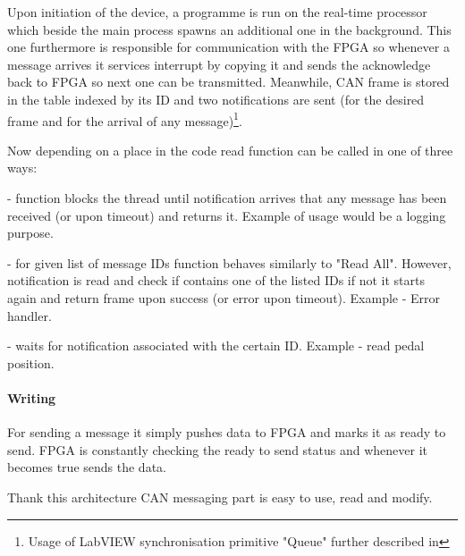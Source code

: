 Upon initiation of the device, a programme is run on the real-time processor which beside the main process spawns an additional one in the background. This one furthermore is responsible for communication with the FPGA so whenever a message arrives it services interrupt by copying it and sends the acknowledge back to FPGA so next one can be transmitted. Meanwhile, CAN frame is stored in the table indexed by its ID and two notifications are sent (for the desired frame and for the arrival of any message)\footnote{Usage of LabVIEW synchronisation primitive "Queue" further described in }.

Now depending on a place in the code read function can be called in one of three ways:
\begin{description}[labelindent=1cm]
    \item[Read All] - function blocks the thread until notification arrives that any message has been received (or upon timeout) and returns it. Example of usage would be a logging purpose.
    \item[Read Some] - for given list of message IDs function behaves similarly to "Read All". However, notification is read and check if contains one of the listed IDs if not it starts again and return frame upon success (or error upon timeout). Example - Error handler.
    \item[Read ID] - waits for notification associated with the certain ID. Example - read pedal position.
    


\end{description}

\paragraph{Writing}
For sending a message it simply pushes data to FPGA and marks it as ready to send. FPGA is constantly checking the ready to send status and whenever it becomes true sends the data.

\vspace{5mm}
\noindent Thank this architecture CAN messaging part is easy to use, read and modify.


